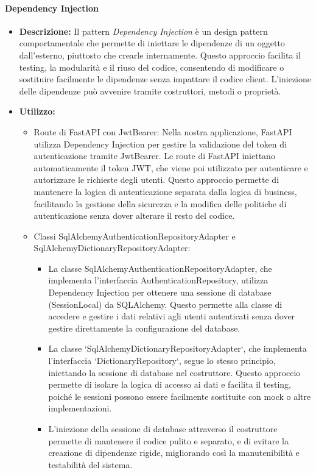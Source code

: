 \paragraph{Dependency Injection}
\begin{itemize}
    \item{\textbf{Descrizione:}} Il pattern \textit{Dependency Injection} è un design pattern comportamentale che permette di iniettare le dipendenze di un oggetto dall'esterno, piuttosto che crearle internamente. Questo approccio facilita il testing, la modularità e il riuso del codice, consentendo di modificare o sostituire facilmente le dipendenze senza impattare il codice client. L'iniezione delle dipendenze può avvenire tramite costruttori, metodi o proprietà.
    \item{\textbf{Utilizzo:}}
    \begin{itemize}
        \item Route di FastAPI con JwtBearer: Nella nostra applicazione, FastAPI utilizza Dependency Injection per gestire la validazione del token di autenticazione tramite JwtBearer. Le route di FastAPI iniettano automaticamente il token JWT, che viene poi utilizzato per autenticare e autorizzare le richieste degli utenti. Questo approccio permette di mantenere la logica di autenticazione separata dalla logica di business, facilitando la gestione della sicurezza e la modifica delle politiche di autenticazione senza dover alterare il resto del codice.
        \item Classi SqlAlchemyAuthenticationRepositoryAdapter e SqlAlchemyDictionaryRepositoryAdapter:
        \begin{itemize}
            \item La classe SqlAlchemyAuthenticationRepositoryAdapter, che implementa l'interfaccia AuthenticationRepository, utilizza Dependency Injection per ottenere una sessione di database (SessionLocal) da SQLAlchemy. Questo permette alla classe di accedere e gestire i dati relativi agli utenti autenticati senza dover gestire direttamente la configurazione del database.
            \item La classe `SqlAlchemyDictionaryRepositoryAdapter`, che implementa l'interfaccia `DictionaryRepository`, segue lo stesso principio, iniettando la sessione di database nel costruttore. Questo approccio permette di isolare la logica di accesso ai dati e facilita il testing, poiché le sessioni possono essere facilmente sostituite con mock o altre implementazioni.
            \item L'iniezione della sessione di database attraverso il costruttore permette di mantenere il codice pulito e separato, e di evitare la creazione di dipendenze rigide, migliorando così la manutenibilità e testabilità del sistema.
        \end{itemize}
    \end{itemize}
\end{itemize}


